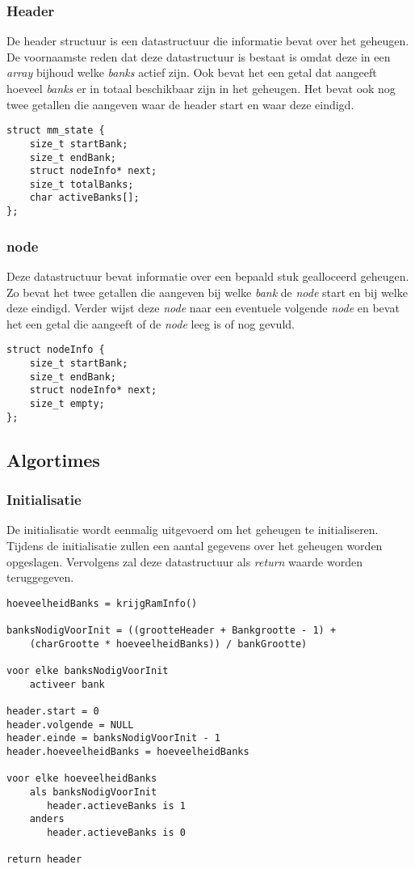 \documentclass{uva-inf-article}
\begin{document}
\subsubsection{Header}
De header structuur is een datastructuur die informatie bevat over het geheugen.
De voornaamste reden dat deze datastructuur is bestaat is omdat deze in een \textit{array}
bijhoud welke \textit{banks} actief zijn. Ook bevat het een getal dat aangeeft hoeveel
\textit{banks} er in totaal beschikbaar zijn in het geheugen. Het bevat ook nog twee
getallen die aangeven waar de header start en waar deze eindigd.
\begin{lstlisting}
struct mm_state {
    size_t startBank;
    size_t endBank;
    struct nodeInfo* next;
    size_t totalBanks;
    char activeBanks[];
};
\end{lstlisting}

\subsubsection{node}
Deze datastructuur bevat informatie over een bepaald stuk gealloceerd geheugen.
Zo bevat het twee getallen die aangeven bij welke \textit{bank} de \textit{node} start en bij welke
deze eindigd. Verder wijst deze \textit{node} naar een eventuele volgende \textit{node}
en bevat het een getal die aangeeft of de \textit{node} leeg is of nog gevuld.
\begin{lstlisting}
struct nodeInfo {
    size_t startBank;
    size_t endBank;
    struct nodeInfo* next;
    size_t empty;
};
\end{lstlisting}
\subsection{Algortimes}
\subsubsection{Initialisatie}
De initialisatie wordt eenmalig uitgevoerd om het geheugen te initialiseren. Tijdens de
initialisatie zullen een aantal gegevens over het geheugen worden opgeslagen. Vervolgens
zal deze datastructuur als \textit{return} waarde worden teruggegeven.

\begin{lstlisting}
hoeveelheidBanks = krijgRamInfo()

banksNodigVoorInit = ((grootteHeader + Bankgrootte - 1) +
	(charGrootte * hoeveelheidBanks)) / bankGrootte)

voor elke banksNodigVoorInit
	activeer bank

header.start = 0
header.volgende = NULL
header.einde = banksNodigVoorInit - 1
header.hoeveelheidBanks = hoeveelheidBanks

voor elke hoeveelheidBanks
    als banksNodigVoorInit
	   header.actieveBanks is 1
    anders
       header.actieveBanks is 0

return header
\end{lstlisting}
\end{document}
